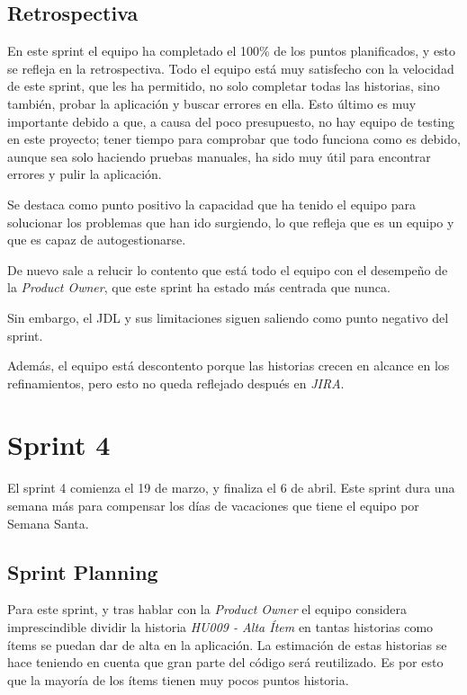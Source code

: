 \subsection{Retrospectiva}
\label{subsec:S3-Retrospectiva}

En este sprint el equipo ha completado el 100\% de los puntos planificados, y esto se refleja en la retrospectiva. Todo el equipo está muy satisfecho con la velocidad de este sprint, que les ha permitido, no solo completar todas las historias, sino también, probar la aplicación y buscar errores en ella. Esto último es muy importante debido a que, a causa del poco presupuesto, no hay equipo de testing en este proyecto; tener tiempo para comprobar que todo funciona como es debido, aunque sea solo haciendo pruebas manuales, ha sido muy útil para encontrar errores y pulir la aplicación.

Se destaca como punto positivo la capacidad que ha tenido el equipo para solucionar los problemas que han ido surgiendo, lo que refleja que es un equipo  y que es capaz de autogestionarse.

De nuevo sale a relucir lo contento que está todo el equipo con el desempeño de la \emph{Product Owner}, que este sprint ha estado más centrada que nunca.

Sin embargo, el JDL y sus limitaciones siguen saliendo como punto negativo del sprint.

Además, el equipo está descontento porque las historias crecen en alcance en los refinamientos, pero esto no queda reflejado después en \emph{JIRA}.

\section{Sprint 4}
\label{sec:sprint4}

El sprint 4 comienza el 19 de marzo, y finaliza el 6 de abril. Este sprint dura una semana más para compensar los días de vacaciones que tiene el equipo por Semana Santa.

\subsection{Sprint Planning}
\label{subsec:S4-SP}


Para este sprint, y tras hablar con la \emph{Product Owner} el equipo considera imprescindible dividir la historia \emph{HU009 - Alta Ítem} en tantas historias como ítems se puedan dar de alta en la aplicación. La estimación de estas historias se hace teniendo en cuenta que gran parte del código será reutilizado. Es por esto que la mayoría de los ítems tienen muy pocos puntos historia.

